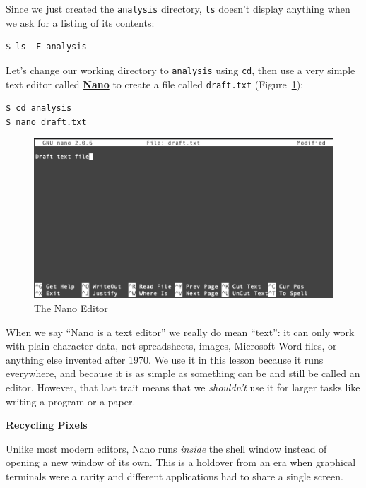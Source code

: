 \documentclass[
]{krantz}
\renewenvironment{quote}{\begin{VF}}{\end{VF}}
\newcommand{\gref}[2]{\hyperlink{#2}{\textbf{#1}}}
\begin{document}
Since we just created the \texttt{analysis} directory,
\texttt{ls} doesn't display anything when we ask for a listing of its contents:

\begin{verbatim}
$ ls -F analysis
\end{verbatim}

Let's change our working directory to \texttt{analysis} using \texttt{cd},
then use a very simple text editor called \gref{Nano}{nano\_editor} to create a file called \texttt{draft.txt}
(Figure~\ref{fig:bash-basics-nano}):

\begin{verbatim}
$ cd analysis
$ nano draft.txt
\end{verbatim}

\begin{figure}

{\centering \includegraphics[width=1\linewidth]{figures/bash-basics/nano-editor} 

}

\caption{The Nano Editor}\label{fig:bash-basics-nano}
\end{figure}

When we say ``Nano is a text editor'' we really do mean ``text'':
it can only work with plain character data,
not spreadsheets, images, Microsoft Word files, or anything else invented after 1970.
We use it in this lesson because it runs everywhere,
and because it is as simple as something can be and still be called an editor.
However,
that last trait means that we \emph{shouldn't} use it for larger tasks
like writing a program or a paper.

\begin{quote}
\textbf{Recycling Pixels}

Unlike most modern editors,
Nano runs \emph{inside} the shell window instead of opening a new window of its own.
This is a holdover from an era when graphical terminals were a rarity
and different applications had to share a single screen.
\end{quote}
\end{document}
